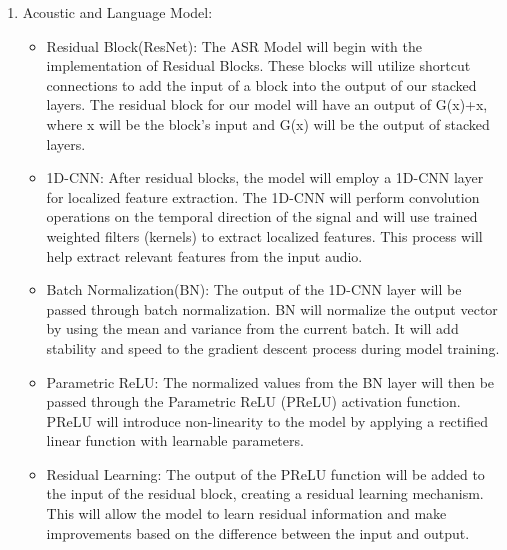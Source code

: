 \begin{enumerate}
	\item  Acoustic and Language Model:
	\begin{itemize}
	
	
\item  Residual Block(ResNet): 
 The ASR Model will begin with the implementation of Residual Blocks. These blocks will utilize shortcut connections to add the input of a block into the output of our stacked layers. The residual block for our model will have an output of G(x)+x, where x will be the block's input and G(x) will be the output of stacked layers.
\item   1D-CNN: After residual blocks, the model will employ a 1D-CNN layer for localized feature extraction. The 1D-CNN will perform convolution operations on the temporal direction of the signal and will use trained weighted filters (kernels) to extract localized features. This process will help extract relevant features from the input audio.
\item  Batch Normalization(BN): The output of the 1D-CNN layer will be passed through batch normalization. BN will normalize the output vector by using the mean and variance from the current batch. It will add stability and speed to the gradient descent process during model training.
\item   Parametric ReLU:  The normalized values from the BN layer will then be passed through the Parametric ReLU (PReLU) activation function. PReLU will introduce non-linearity to the model by applying a rectified linear function with learnable parameters.
\item  Residual Learning: The output of the PReLU function will be added to the input of the residual block, creating a residual learning mechanism. This will allow the model to learn residual information and make improvements based on the difference between the input and output.


\end{itemize}
\end{enumerate}
